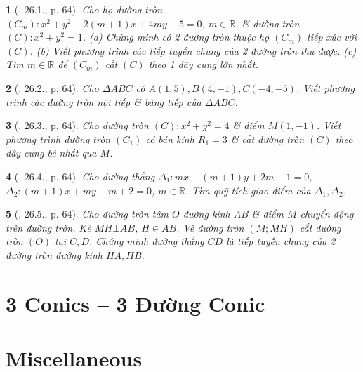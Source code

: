 \documentclass{article}
\newtheorem{baitoan}{}
\begin{document}
\begin{baitoan}[\cite{Hai_Hung_Thu_Tung_ncpt_Toan_10_tap_2}, 26.1., p. 64]
	Cho họ đường tròn $(C_m):x^2 + y^2 - 2(m + 1)x + 4my - 5 = 0$, $m\in\mathbb{R}$, \& đường tròn $(C):x^2 + y^2 = 1$. (a) Chứng minh có 2 đường tròn thuộc họ $(C_m)$ tiếp xúc với $(C)$. (b) Viết phương trình các tiếp tuyến chung của 2 đường tròn thu được. (c) Tìm $m\in\mathbb{R}$ để $(C_m)$ cắt $(C)$ theo 1 dây cung lớn nhất.
\end{baitoan}

\begin{baitoan}[\cite{Hai_Hung_Thu_Tung_ncpt_Toan_10_tap_2}, 26.2., p. 64]
	Cho $\Delta ABC$ có $A(1,5),B(4,-1),C(-4,-5)$. Viết phương trình các đường tròn nội tiếp \& bàng tiếp của $\Delta ABC$.
\end{baitoan}

\begin{baitoan}[\cite{Hai_Hung_Thu_Tung_ncpt_Toan_10_tap_2}, 26.3., p. 64]
	Cho đường tròn $(C):x^2 + y^2 = 4$ \& điểm $M(1,-1)$. Viết phương trình đường tròn $(C_1)$ có bán kính $R_1 = 3$ \& cắt đường tròn $(C)$ theo dây cung bé nhất qua $M$.
\end{baitoan}

\begin{baitoan}[\cite{Hai_Hung_Thu_Tung_ncpt_Toan_10_tap_2}, 26.4., p. 64]
	Cho đường thẳng $\Delta_1:mx - (m + 1)y + 2m - 1 = 0$, $\Delta_2:(m + 1)x + my - m + 2 = 0$, $m\in\mathbb{R}$. Tìm quỹ tích giao điểm của $\Delta_1,\Delta_2$.
\end{baitoan}

\begin{baitoan}[\cite{Hai_Hung_Thu_Tung_ncpt_Toan_10_tap_2}, 26.5., p. 64]
	Cho đường tròn tâm $O$ đường kính $AB$ \& điểm $M$ chuyển động trên đường tròn. Kẻ $MH\bot AB$, $H\in AB$. Vẽ đường tròn $(M;MH)$ cắt đường tròn $(O)$ tại $C,D$. Chứng minh đường thẳng $CD$ là tiếp tuyến chung của 2 đường tròn đường kính $HA,HB$.
\end{baitoan}


\section{3 Conics -- 3 Đường Conic}


\section{Miscellaneous}


\printbibliography[heading=bibintoc]
	
\end{document}
